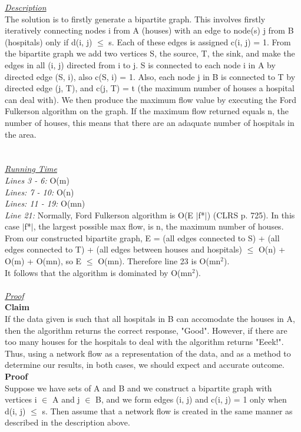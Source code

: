 \documentclass[10pt]{csc_assignment}
\begin{document}
\begin{description}
\begin{algorithm}[H]
\end{algorithm}
\emph{\underline{Description}}\\
The solution is to firstly generate a bipartite graph.
This involves firstly iteratively connecting nodes i from A (houses) with an edge to node(s) j from B (hospitals) only if  d(i, j) $\leqslant$ s. Each of these edges is assigned c(i, j) = 1. From the bipartite graph we add two vertices S, the source, T, the sink, and make the edges in all (i, j) directed from i to j. S is connected to each node i in A by directed edge (S, i), also c(S, i) = 1. Also, each node j in B is connected to T by directed edge (j, T), and c(j, T) = t (the maximum number of houses a hospital can deal with). We then produce the maximum flow value by executing the Ford Fulkerson algorithm on the graph. If the maximum flow returned equals n, the number of houses, this means that there are an adaquate number of hospitals in the area.\\
\\
\\
\emph{\underline{Running Time}}\\
\emph{Lines 3 - 6:} O(m)\\
\emph{Lines: 7 - 10:} O(n)\\
\emph{Lines: 11 - 19:} O(mn)\\
\emph{Line 21:} Normally, Ford Fulkerson algorithm is O(E $\mid$f*$\mid$) (CLRS p. 725). In this case $\mid$f*$\mid$, the largest possible max flow, is n, the maximum number of houses. From our constructed bipartite graph, E = (all edges connected to S) + (all edges connected to T) + (all edges between houses and hospitals) $\leqslant$ O(n) + O(m) + O(mn), so E $\leqslant$ O(mn). Therefore line 23 is O(mn$^{2}$). \\
It follows that the algorithm is dominated by O(mn$^{2}$).\\
\\
\emph{\underline{Proof}}\\
\textbf{Claim}\\
If the data given is such that all hospitals in B can accomodate the houses in A, then the 
algorithm returns the correct response, "Good". However, if there are too many
houses for the hospitals to deal with the algorithm returns "Eeek!". Thus, using a network 
flow as a representation of the data, and as a method to determine our results, in both cases,
we should expect and accurate outcome.\\
\textbf{Proof}\\
Suppose we have sets of A and B and we construct a bipartite graph with vertices i $\in$ A and j $\in$ B, and we form edges (i, j) and c(i, j) = 1 only when d(i, j) $\leqslant$ s. Then assume that a network flow is created in the same manner as described in the description above.\\

\end{description}
\end{document}
